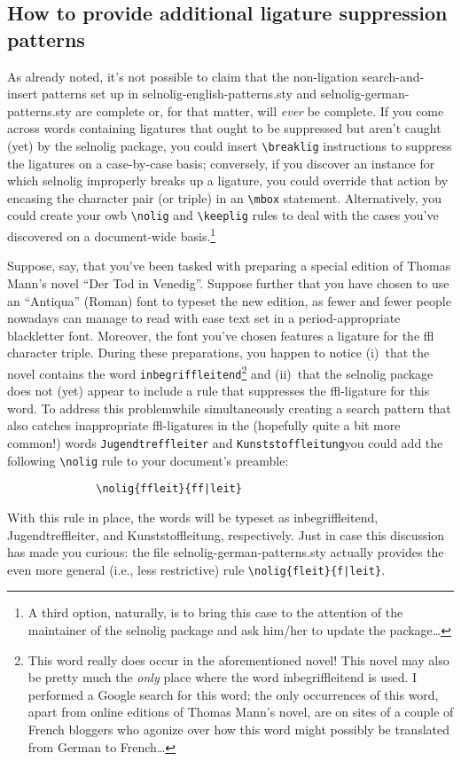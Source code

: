 \documentclass[11pt]{article}
\newcommand{\pkg}[1]{\textsf{#1}}
\newcommand{\opt}[1]{\texttt{#1}}
\newcommand{\cmmd}[1]{\texttt{\textbackslash #1}}
\begin{document}
\subsection{How to provide additional ligature suppression patterns}

As already noted, it's not possible to claim that the non-ligation search-and-insert patterns set up in \pkg{selnolig-english-patterns.sty} and \pkg{selnolig-german-patterns.sty} are complete or, for that matter, will \emph{ever} be complete. If you come across words containing ligatures that ought to be suppressed but aren't caught (yet) by the \pkg{selnolig} package, you could insert \cmmd{breaklig} instructions to suppress the ligatures on a case-by-case basis; conversely, if you discover an instance for which \pkg{selnolig} improperly breaks up a ligature, you could override that action by encasing the character pair (or triple) in an \cmmd{mbox} statement. Alternatively, you could create your owb \cmmd{nolig} and \cmmd{keeplig} rules to deal with the cases you've discovered on a document-wide basis.\footnote{A third option, naturally, is to bring this case to the attention of the maintainer of the \pkg{selnolig} package and ask him/her to update the package\dots}

Suppose, say, that you've been tasked with preparing a special edition of Thomas Mann's novel \enquote{Der Tod in Venedig}. Suppose further that you have chosen to use an \enquote{Antiqua} (Roman) font to typeset the new edition, as fewer and fewer people nowadays can manage to read with ease text set in a {\blackletterfont period-appropriate blackletter font}. Moreover, the font you've chosen features a ligature for the ffl character triple. During these preparations, you happen to notice (i)~that the novel contains the word \opt{inbegriffleitend}\footnote{This word really does occur in the aforementioned novel! This novel may also be pretty much the \emph{only} place where the word inbegriffleitend is used. I performed a Google search for this word; the only occurrences of this word, apart from online editions of Thomas Mann's novel, are on sites of a couple of French bloggers who agonize over how this word might possibly be translated from German to French\dots} and (ii)~that the \pkg{selnolig} package does not (yet) appear to include a rule that suppresses the ffl-ligature for this word. To address this problem\textemdash while simultaneously creating a search pattern that also catches inappropriate ffl-ligatures in the (hopefully quite a bit more common!) words \opt{Jugendtreffleiter} and \opt{Kunststoffleitung}\textemdash you could add the following \Verb+\nolig+ rule to your document's preamble:
\begin{Verbatim}
              \nolig{ffleit}{ff|leit}
\end{Verbatim}
With this rule in place, the words will be typeset as inbegriffleitend, Jugendtreffleiter, and Kunststoffleitung, respectively. Just in case this discussion has made you curious: the file \pkg{selnolig-german-patterns.sty} actually provides the even more general (i.e., less restrictive) rule \Verb+\nolig{fleit}{f|leit}+.
\end{document}
